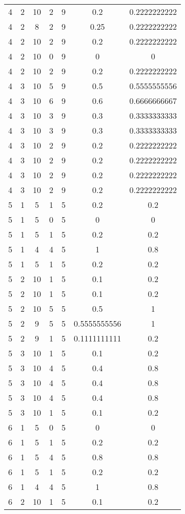\begin{longtable}[c]{| c | c | c | c | c | c | c |}
4	&	2	&	10	&	2	&	9	&	0.2	&	0.2222222222	\\
4	&	2	&	8	&	2	&	9	&	0.25	&	0.2222222222	\\
4	&	2	&	10	&	2	&	9	&	0.2	&	0.2222222222	\\
4	&	2	&	10	&	0	&	9	&	0	&	0	\\
4	&	2	&	10	&	2	&	9	&	0.2	&	0.2222222222	\\
4	&	3	&	10	&	5	&	9	&	0.5	&	0.5555555556	\\
4	&	3	&	10	&	6	&	9	&	0.6	&	0.6666666667	\\
4	&	3	&	10	&	3	&	9	&	0.3	&	0.3333333333	\\
4	&	3	&	10	&	3	&	9	&	0.3	&	0.3333333333	\\
4	&	3	&	10	&	2	&	9	&	0.2	&	0.2222222222	\\
4	&	3	&	10	&	2	&	9	&	0.2	&	0.2222222222	\\
4	&	3	&	10	&	2	&	9	&	0.2	&	0.2222222222	\\
4	&	3	&	10	&	2	&	9	&	0.2	&	0.2222222222	\\
5	&	1	&	5	&	1	&	5	&	0.2	&	0.2	\\
5	&	1	&	5	&	0	&	5	&	0	&	0	\\
5	&	1	&	5	&	1	&	5	&	0.2	&	0.2	\\
5	&	1	&	4	&	4	&	5	&	1	&	0.8	\\
5	&	1	&	5	&	1	&	5	&	0.2	&	0.2	\\
5	&	2	&	10	&	1	&	5	&	0.1	&	0.2	\\
5	&	2	&	10	&	1	&	5	&	0.1	&	0.2	\\
5	&	2	&	10	&	5	&	5	&	0.5	&	1	\\
5	&	2	&	9	&	5	&	5	&	0.5555555556	&	1	\\
5	&	2	&	9	&	1	&	5	&	0.1111111111	&	0.2	\\
5	&	3	&	10	&	1	&	5	&	0.1	&	0.2	\\
5	&	3	&	10	&	4	&	5	&	0.4	&	0.8	\\
5	&	3	&	10	&	4	&	5	&	0.4	&	0.8	\\
5	&	3	&	10	&	4	&	5	&	0.4	&	0.8	\\
5	&	3	&	10	&	1	&	5	&	0.1	&	0.2	\\
6	&	1	&	5	&	0	&	5	&	0	&	0	\\
6	&	1	&	5	&	1	&	5	&	0.2	&	0.2	\\
6	&	1	&	5	&	4	&	5	&	0.8	&	0.8	\\
6	&	1	&	5	&	1	&	5	&	0.2	&	0.2	\\
6	&	1	&	4	&	4	&	5	&	1	&	0.8	\\
6	&	2	&	10	&	1	&	5	&	0.1	&	0.2	\\

\end{longtable}
